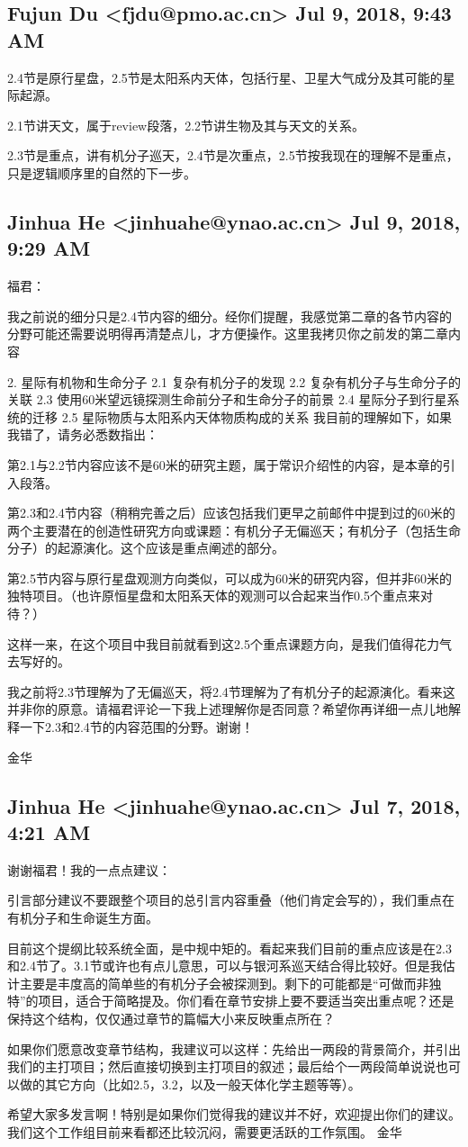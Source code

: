 \documentclass{article}
\newcommand\from[2]{\subsection{{#1} {#2}}}
\newcommand\said[1]{#1}
\begin{document}
\from{
Fujun Du <fjdu@pmo.ac.cn>
}{
Jul 9, 2018, 9:43 AM
}
\said{
2.4节是原行星盘，2.5节是太阳系内天体，包括行星、卫星大气成分及其可能的星际起源。

2.1节讲天文，属于review段落，2.2节讲生物及其与天文的关系。

2.3节是重点，讲有机分子巡天，2.4节是次重点，2.5节按我现在的理解不是重点，只是逻辑顺序里的自然的下一步。
}

\from{
Jinhua He <jinhuahe@ynao.ac.cn>
}{
Jul 9, 2018, 9:29 AM
}
\said{
福君：

我之前说的细分只是2.4节内容的细分。经你们提醒，我感觉第二章的各节内容的分野可能还需要说明得再清楚点儿，才方便操作。这里我拷贝你之前发的第二章内容

2. 星际有机物和生命分子
2.1 复杂有机分子的发现
2.2 复杂有机分子与生命分子的关联
2.3 使用60米望远镜探测生命前分子和生命分子的前景
2.4 星际分子到行星系统的迁移
2.5 星际物质与太阳系内天体物质构成的关系
我目前的理解如下，如果我错了，请务必悉数指出：

第2.1与2.2节内容应该不是60米的研究主题，属于常识介绍性的内容，是本章的引入段落。

第2.3和2.4节内容（稍稍完善之后）应该包括我们更早之前邮件中提到过的60米的两个主要潜在的创造性研究方向或课题：有机分子无偏巡天；有机分子（包括生命分子）的起源演化。这个应该是重点阐述的部分。

第2.5节内容与原行星盘观测方向类似，可以成为60米的研究内容，但并非60米的独特项目。（也许原恒星盘和太阳系天体的观测可以合起来当作0.5个重点来对待？）

这样一来，在这个项目中我目前就看到这2.5个重点课题方向，是我们值得花力气去写好的。

我之前将2.3节理解为了无偏巡天，将2.4节理解为了有机分子的起源演化。看来这并非你的原意。请福君评论一下我上述理解你是否同意？希望你再详细一点儿地解释一下2.3和2.4节的内容范围的分野。谢谢！

金华
}


\from{
Jinhua He <jinhuahe@ynao.ac.cn>
}{
Jul 7, 2018, 4:21 AM
}
\said{
谢谢福君！我的一点点建议：

引言部分建议不要跟整个项目的总引言内容重叠（他们肯定会写的），我们重点在有机分子和生命诞生方面。

目前这个提纲比较系统全面，是中规中矩的。看起来我们目前的重点应该是在2.3和2.4节了。3.1节或许也有点儿意思，可以与银河系巡天结合得比较好。但是我估计主要是丰度高的简单些的有机分子会被探测到。剩下的可能都是“可做而非独特”的项目，适合于简略提及。你们看在章节安排上要不要适当突出重点呢？还是保持这个结构，仅仅通过章节的篇幅大小来反映重点所在？

如果你们愿意改变章节结构，我建议可以这样：先给出一两段的背景简介，并引出我们的主打项目；然后直接切换到主打项目的叙述；最后给个一两段简单说说也可以做的其它方向（比如2.5，3.2，以及一般天体化学主题等等）。

希望大家多发言啊！特别是如果你们觉得我的建议并不好，欢迎提出你们的建议。我们这个工作组目前来看都还比较沉闷，需要更活跃的工作氛围。
金华
}
\end{document}
